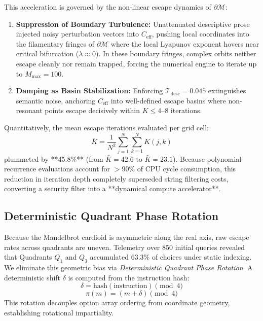 \documentclass[10pt,journal,compsoc,twocolumn]{article}
\begin{document}
This acceleration is governed by the non-linear escape dynamics of $\partial \mathcal{M}$:
\begin{enumerate}
    \item \textbf{Suppression of Boundary Turbulence:} Unattenuated descriptive prose injected noisy perturbation vectors into $C_{\text{eff}}$, pushing local coordinates into the filamentary fringes of $\partial \mathcal{M}$ where the local Lyapunov exponent hovers near critical bifurcation ($\lambda \approx 0$). In these boundary fringes, complex orbits neither escape cleanly nor remain trapped, forcing the numerical engine to iterate up to $M_{\max} = 100$.
    \item \textbf{Damping as Basin Stabilization:} Enforcing $\mathcal{T}_{\text{desc}} = 0.045$ extinguishes semantic noise, anchoring $C_{\text{eff}}$ into well-defined escape basins where non-resonant points escape decisively within $K \le 4\text{--}8$ iterations.
\end{enumerate}
Quantitatively, the mean escape iterations evaluated per grid cell:
\begin{equation}
\bar{K} = \frac{1}{N^2} \sum_{j=1}^N \sum_{k=1}^N K(j, k)
\end{equation}
plummeted by **45.8\%** (from $\bar{K} = 42.6$ to $\bar{K} = 23.1$). Because polynomial recurrence evaluations account for $>90\%$ of CPU cycle consumption, this reduction in iteration depth completely superseded string filtering costs, converting a security filter into a **dynamical compute accelerator**.

\subsection{Deterministic Quadrant Phase Rotation}
Because the Mandelbrot cardioid is asymmetric along the real axis, raw escape rates across quadrants are uneven. Telemetry over 850 initial queries revealed that Quadrants $Q_1$ and $Q_3$ accumulated $63.3\%$ of choices under static indexing. We eliminate this geometric bias via \textit{Deterministic Quadrant Phase Rotation}. A deterministic shift $\delta$ is computed from the instruction hash:
\begin{equation}
\delta = \text{hash}(\text{instruction}) \pmod 4
\end{equation}
\begin{equation}
\pi(m) = (m + \delta) \pmod 4
\end{equation}
This rotation decouples option array ordering from coordinate geometry, establishing rotational impartiality.
\end{document}
